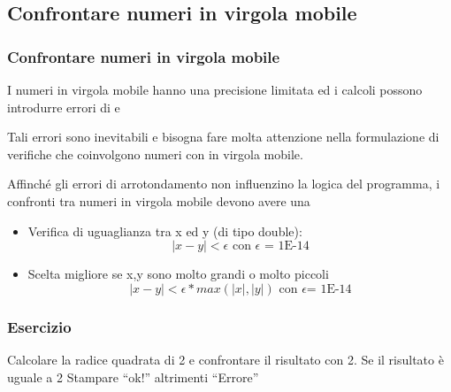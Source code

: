 \subsection*{Confrontare numeri in virgola mobile}
\begin{frame}
\frametitle{Confrontare numeri in virgola mobile}
\begin{block}{}
I numeri in virgola mobile hanno una precisione limitata ed i calcoli possono introdurre errori di  e 
\end{block}
\begin{block}{}
Tali errori sono inevitabili e bisogna fare molta attenzione nella formulazione di verifiche che coinvolgono numeri con in 
virgola mobile.
\end{block}
\end{frame}

\begin{frame}
\begin{block}{}
Affinché gli errori di arrotondamento non influenzino la logica del programma, i confronti tra numeri in virgola mobile devono avere
una 
\end{block}
\begin{block}{}
\begin{itemize}
\item Verifica di uguaglianza tra x ed y (di tipo double): 
\textbf{$$ |x-y| < \epsilon \mbox{ con }\epsilon \mbox{ = 1E-14} $$}
\item Scelta migliore se x,y sono molto grandi o molto piccoli
\textbf{$$|x-y| < \epsilon*max(|x|,|y|) \mbox{ con  }\epsilon \mbox{= 1E-14}$$}
\end{itemize}
\end{block}
\end{frame}

\begin{frame}
\frametitle{Esercizio}
\begin{block}{}
Calcolare la radice quadrata di 2 e confrontare il risultato con 2. Se il risultato è uguale a 2 Stampare ``ok!'' altrimenti ``Errore''
\end{block}
\end{frame}

